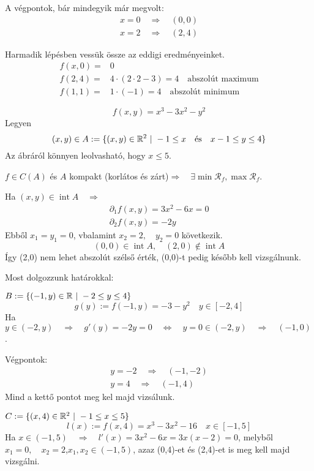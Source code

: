 \documentclass[a4paper,11.5pt]{article}
\DeclareMathOperator{\Int}{int}
\begin{document}
\begin{task}
		A végpontok, bár mindegyik már megvolt:
		\begin{align*}
			x=0\quad \Rightarrow\quad (0,0)\\
			x=2\quad \Rightarrow\quad (2,4)
		\end{align*}
		
		Harmadik lépésben vessük össze az eddigi eredményeinket.
		\begin{align*}
			f(x,0)=&0\\
			f(2,4)=&4\cdot(2\cdot2-3)=4\quad \text{abszolút maximum}\\
			f(1,1)=&1\cdot(-1)=4\quad \text{abszolút minimum}\
		\end{align*}
	\end{task}
	\begin{task}
		\[ f(x,y)=x^3-3x^2-y^2 \]
		Legyen
		\[ (x,y)\in A:=\{ (x,y)\in\R^2\ | \ -1\leq x\quad \text{és}\quad x-1\leq y\leq 4 \} \]
		Az ábráról könnyen leolvasható, hogy $x\leq 5$.
		
		$f\in C(A)$ és $A$ kompakt (korlátos és zárt)\quad $\Rightarrow\quad \exists\min\mathcal{R}_f, \max\mathcal{R}_f$.
		
		Ha $(x,y)\in\Int A\quad \Rightarrow$
		\begin{align*}
			\partial_1f(x,y)=3x^2-6x=0\\
			\partial_2f(x,y)=-2y
		\end{align*}
		Ebből $x_1=y_1=0$, vbalamint $x_2=2,\quad y_2=0$ következik. 
		\[ (0,0)\in\Int A,\quad (2,0)\notin\Int A \]
		Így (2,0) nem lehet abszolút szélső érték, (0,0)-t pedig később kell vizsgálnunk.
		
		Most dolgozzunk  határokkal:
		
		
		$B:=\{ (-1,y)\in\mathbb{R}\ | \ -2\leq y\leq 4 \}$
		\[ g(y):=f(-1,y)=-3-y^2\quad y\in[-2,4] \]
		Ha $y\in(-2,y)\quad \Rightarrow\quad g'(y)=-2y=0\quad \Leftrightarrow\quad y=0\in(-2,y)\quad \Rightarrow\quad (-1,0)$.
		
		Végpontok:
		\begin{align*}
			y=-2\quad \Rightarrow\quad (-1,-2)\\
			y=4\quad \Rightarrow\quad (-1,4)
		\end{align*}
		Mind a kettő pontot meg kel majd vizsálunk.
		
		$C:=\{ (x,4)\in\mathbb{R}^2\ | \ -1\leq x\leq 5 \}$
		\[ l(x):=f(x,4)=x^3-3x^2-16\quad x\in[-1,5] \]
		Ha $x\in(-1,5)\quad \Rightarrow\quad l'(x)=3x^2-6x=3x(x-2)=0$, melyből $x_1=0,\quad x_2=2$,\quad $x_1,x_2\in(-1,5)$, azaz (0,4)-et és (2,4)-et is meg kell majd vizsgálni.
		

\end{task}
\end{document}
